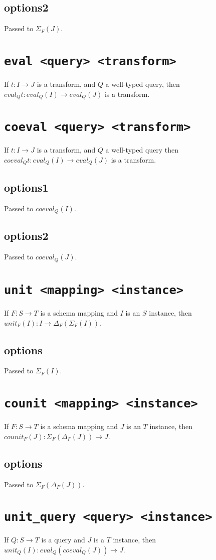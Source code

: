 \documentclass[10pt]{book}
\begin{document}
\subsection{options2}
Passed to $\Sigma_F(J)$.

\section{{\tt eval <query> <transform>}}
If $t : I \to J$ is a transform, and $Q$ a well-typed query, then $eval_Qt : eval_Q(I) \to eval_Q(J)$ is a transform.

\section{{\tt coeval <query> <transform>}}
If $t : I \to J$ is a transform, and $Q$ a well-typed query then $coeval_Qt : eval_Q(I) \to eval_Q(J)$ is a transform.
\subsection{options1}
Passed to $coeval_Q(I)$.
\subsection{options2}
Passed to $coeval_Q(J)$.

\section{{\tt unit <mapping> <instance>}}
If $F : S \to T$ is a schema mapping and $I$ is an $S$ instance, then $unit_F(I) : I \to \Delta_F(\Sigma_F(I))$.
\subsection{options}
Passed to $\Sigma_F(I)$.

\section{{\tt counit <mapping> <instance>}}
If $F : S \to T$ is a schema mapping and $J$ is an $T$ instance, then $counit_F(J) : \Sigma_F(\Delta_F(J))  \to J$.
\subsection{options}
Passed to $\Sigma_F(\Delta_F(J))$.

\section{{\tt unit\_query <query> <instance>}}
If $Q : S \to T$ is a query and $J$ is a $T$ instance, then $unit_Q(I) : eval_Q(coeval_Q(J)) \to J$.
\end{document}
